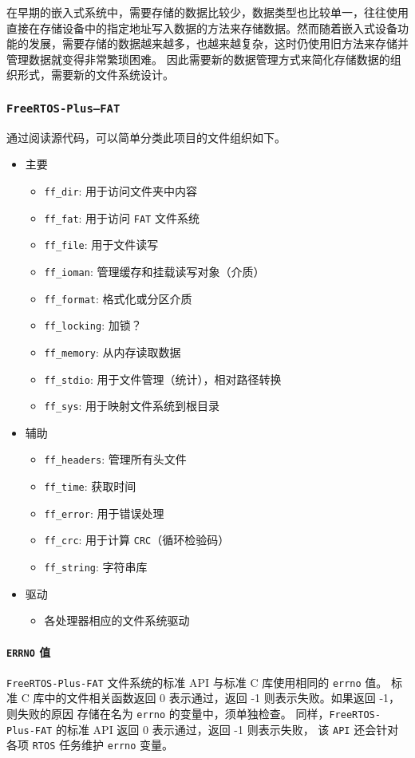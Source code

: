 \documentclass[a4paper]{article}
\begin{document}
在早期的嵌入式系统中，需要存储的数据比较少，数据类型也比较单一，往往使用直接在存储设备中的指定地址写入数据的方法来存储数据。然而随着嵌入式设备功能的发展，需要存储的数据越来越多，也越来越复杂，这时仍使用旧方法来存储并管理数据就变得非常繁琐困难。
因此需要新的数据管理方式来简化存储数据的组织形式，需要新的文件系统设计。

\subsubsection{\texttt{FreeRTOS-Plus—FAT}}
通过阅读源代码，可以简单分类此项目的文件组织如下。
\begin{itemize}
\item 主要
\begin{itemize}
    \item \texttt{ff\_dir}: 用于访问文件夹中内容
    \item \texttt{ff\_fat}: 用于访问 \texttt{FAT} 文件系统
    \item \texttt{ff\_file}: 用于文件读写
    \item \texttt{ff\_ioman}: 管理缓存和挂载读写对象（介质）
    \item \texttt{ff\_format}: 格式化或分区介质
    \item \texttt{ff\_locking}: 加锁？
    \item \texttt{ff\_memory}: 从内存读取数据
    \item \texttt{ff\_stdio}: 用于文件管理（统计），相对路径转换
    \item \texttt{ff\_sys}: 用于映射文件系统到根目录
\end{itemize}
\item 辅助
\begin{itemize}
    \item \texttt{ff\_headers}: 管理所有头文件
    \item \texttt{ff\_time}: 获取时间
    \item \texttt{ff\_error}:  用于错误处理
    \item \texttt{ff\_crc}: 用于计算 \texttt{CRC}（循环检验码）
    \item \texttt{ff\_string}: 字符串库
\end{itemize}
\item 驱动
\begin{itemize}
    \item 各处理器相应的文件系统驱动
\end{itemize}
\end{itemize}

\paragraph{\texttt{ERRNO} 值} \texttt{FreeRTOS-Plus-FAT} 文件系统的标准 API 与标准 C 库使用相同的 \texttt{errno} 值。
标准 C 库中的文件相关函数返回 0 表示通过，返回 -1 则表示失败。如果返回 -1，则失败的原因 存储在名为 \texttt{errno} 的变量中，须单独检查。 
同样，\texttt{FreeRTOS-Plus-FAT} 的标准 API 返回 0 表示通过，返回 -1 则表示失败， 该 \texttt{API} 还会针对各项 \texttt{RTOS} 任务维护 \texttt{errno} 变量。
\end{document}
